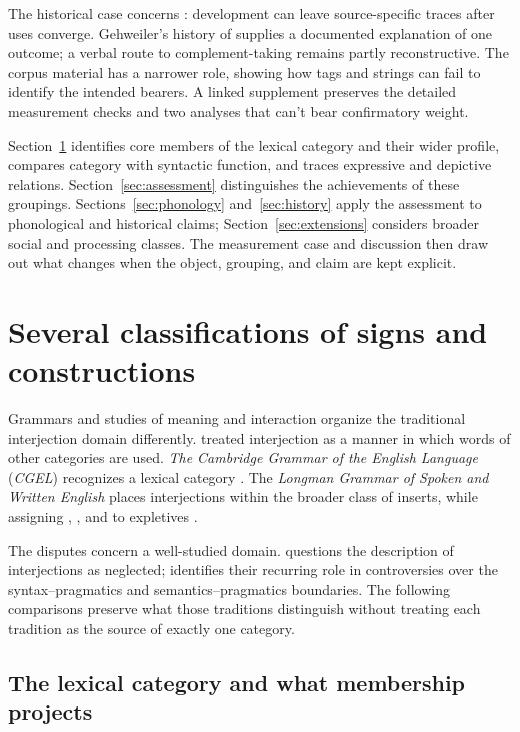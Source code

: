 \documentclass[12pt]{article}
\begin{document}
The historical case concerns : development can leave
source-specific traces after uses converge. Gehweiler's history of
 supplies a documented explanation of one outcome; a verbal
route to complement-taking  remains partly reconstructive.
The corpus material has a narrower role, showing how tags and strings
can fail to identify the intended bearers. A linked supplement preserves
the detailed measurement checks and two analyses that can't bear
confirmatory weight.

Section~\ref{sec:worked} identifies core members of the lexical category
and their wider profile,
compares category with syntactic function, and traces expressive and depictive
relations. Section~\ref{sec:assessment} distinguishes the achievements
of these groupings. Sections~\ref{sec:phonology} and~\ref{sec:history}
apply the assessment to phonological and historical claims;
Section~\ref{sec:extensions} considers broader social and processing
classes. The measurement case and discussion then draw out what changes
when the object, grouping, and claim are kept explicit.

\section{Several classifications of signs and constructions}\label{sec:worked}

Grammars and studies of meaning and interaction organize the traditional
interjection domain differently. \textcite[90]{jespersen1924} treated
interjection as a manner in which words of other categories are used.
\textit{The Cambridge Grammar of the English Language} (\textit{CGEL})
recognizes a lexical category \citep[22]{HuddlestonPullum2002}. The
\textit{Longman Grammar of Spoken and Written English} places interjections
within the broader class of inserts, while assigning ,
, and  to expletives
\citep[1082--1083, 1094--1095]{Biber1999}.

The disputes concern a well-studied domain. \textcite{libert2019} questions
the description of interjections as neglected; \textcite[63]{cram2008}
identifies their recurring role in controversies over the syntax--pragmatics
and semantics--pragmatics boundaries. The following comparisons preserve
what those traditions distinguish without treating each tradition as the
source of exactly one category.

\subsection{The lexical category and what membership projects}\label{sec:grammatical-core}
\end{document}
